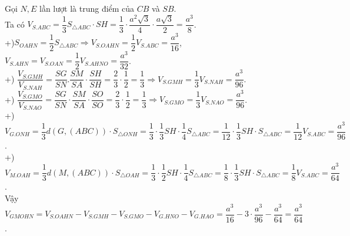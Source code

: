 \begin{ex}
{\begin{center}
		\end{center}
		Gọi $N,E$ lần lượt là trung điểm của $CB$ và $SB$.\\
		Ta có ${V_{S.ABC}}=\dfrac{1}{3}{S_{\triangle ABC}}\cdot SH=\dfrac{1}{3}\cdot\dfrac{a^2\sqrt{3}}{4}\cdot\dfrac{a\sqrt{3}}{2}=\dfrac{a^3}{8}$.\\
		+)${S_{OAHN}}=\dfrac{1}{2}{S_{\triangle ABC}}\Rightarrow {V_{S.OAHN}}=\dfrac{1}{2}{V_{S.ABC}}=\dfrac{a^3}{16}$, ${V_{S.AHN}}={V_{S.OAN}}=\dfrac{1}{2}{V_{S.AHNO}}=\dfrac{a^3}{32}$.\\
		+) $\dfrac{{V_{S.GMH}}}{{V_{S.NAH}}}=\dfrac{SG}{SN}.\dfrac{SM}{SA}\cdot\dfrac{SH}{SH}=\dfrac{2}{3}\cdot\dfrac{1}{2}=\dfrac{1}{3}\Rightarrow {V_{S.GMH}}=\dfrac{1}{3}{V_{S.NAH}}=\dfrac{a^3}{96}$.\\
		+) $\dfrac{{V_{S.GMO}}}{{V_{S.NAO}}}=\dfrac{SG}{SN}\cdot\dfrac{SM}{SA}\cdot\dfrac{SO}{SO}=\dfrac{2}{3}\cdot\dfrac{1}{2}=\dfrac{1}{3}\Rightarrow {V_{S.GMO}}=\dfrac{1}{3}{V_{S.NAO}}=\dfrac{a^3}{96}$.\\
		+) ${V_{G.ONH}}=\dfrac{1}{3}d\left( G,\left( ABC \right) \right)\cdot{S_{\triangle ONH}}=\dfrac{1}{3}\cdot\dfrac{1}{3}SH\cdot\dfrac{1}{4}{S_{\triangle ABC}}=\dfrac{1}{12}\cdot\dfrac{1}{3}SH\cdot{S_{\triangle ABC}}=\dfrac{1}{12}{V_{S.ABC}}=\dfrac{a^3}{96}$.\\
		+) ${V_{M.OAH}}=\dfrac{1}{3}d\left( M,\left( ABC \right) \right)\cdot{S_{\triangle OAH}}=\dfrac{1}{3}\cdot\dfrac{1}{2}SH\cdot\dfrac{1}{4}{S_{\triangle ABC}}=\dfrac{1}{8}\cdot\dfrac{1}{3}SH\cdot{S_{\triangle ABC}}=\dfrac{1}{8}{V_{S.ABC}}=\dfrac{a^3}{64}$.\\
		Vậy ${V_{GMOHN}}={V_{S.OAHN}}-{V_{S.GMH}}-{V_{S.GMO}}-{V_{G.HNO}}-{V_{G.HAO}}=\dfrac{a^3}{16}-3\cdot\dfrac{a^3}{96}-\dfrac{a^3}{64}=\dfrac{a^3}{64}$.}
\end{ex}
